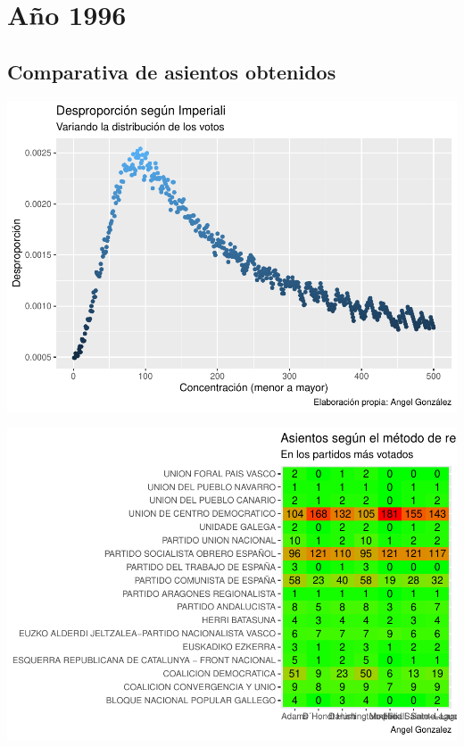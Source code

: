 \documentclass[12pt,a4paper,]{book}
\numberwithin{dummy}{section}
\theoremstyle{ocrenumbox}
\theoremstyle{blacknumex}
\theoremstyle{blacknumbox}
\theoremstyle{ocrenum}
\theoremstyle{ocrenum}
\begin{document}
\hypertarget{auxf1o-1996}{%
\section{Año 1996}\label{auxf1o-1996}}

\hypertarget{comparativa-de-asientos-obtenidos-6}{%
\subsection{Comparativa de asientos
obtenidos}\label{comparativa-de-asientos-obtenidos-6}}

\begin{center}\includegraphics[width=1\linewidth]{figurasR/unnamed-chunk-23-1} \end{center}

\begin{center}\includegraphics[width=1\linewidth]{figurasR/unnamed-chunk-23-2} \end{center}
\end{document}
